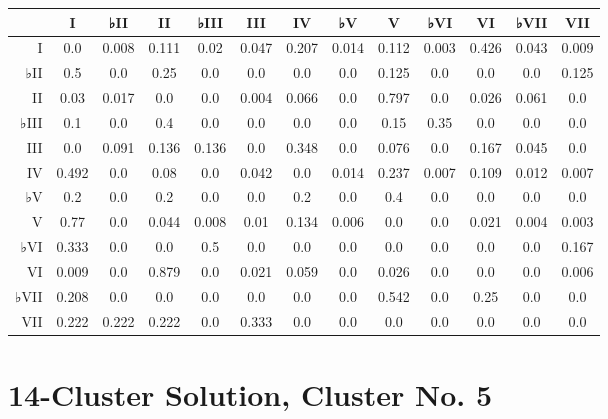 \begin{table}[htbp]
\begin{minipage}{\linewidth}
\setlength{\tymax}{0.5\linewidth}
\centering
\small
\begin{tabulary}{\textwidth}{@{}RCCCCCCCCCCCC@{}} \toprule
&I&♭II&II&♭III&III&IV&♭V&V&♭VI&VI&♭VII&VII\\
\midrule
I&0.0&0.008&0.111&0.02&0.047&0.207&0.014&0.112&0.003&0.426&0.043&0.009\\
♭II&0.5&0.0&0.25&0.0&0.0&0.0&0.0&0.125&0.0&0.0&0.0&0.125\\
II&0.03&0.017&0.0&0.0&0.004&0.066&0.0&0.797&0.0&0.026&0.061&0.0\\
♭III&0.1&0.0&0.4&0.0&0.0&0.0&0.0&0.15&0.35&0.0&0.0&0.0\\
III&0.0&0.091&0.136&0.136&0.0&0.348&0.0&0.076&0.0&0.167&0.045&0.0\\
IV&0.492&0.0&0.08&0.0&0.042&0.0&0.014&0.237&0.007&0.109&0.012&0.007\\
♭V&0.2&0.0&0.2&0.0&0.0&0.2&0.0&0.4&0.0&0.0&0.0&0.0\\
V&0.77&0.0&0.044&0.008&0.01&0.134&0.006&0.0&0.0&0.021&0.004&0.003\\
♭VI&0.333&0.0&0.0&0.5&0.0&0.0&0.0&0.0&0.0&0.0&0.0&0.167\\
VI&0.009&0.0&0.879&0.0&0.021&0.059&0.0&0.026&0.0&0.0&0.0&0.006\\
♭VII&0.208&0.0&0.0&0.0&0.0&0.0&0.0&0.542&0.0&0.25&0.0&0.0\\
VII&0.222&0.222&0.222&0.0&0.333&0.0&0.0&0.0&0.0&0.0&0.0&0.0\\

\bottomrule

\end{tabulary}
\end{minipage}
\end{table}

\section{14-Cluster Solution, Cluster No. 5}
\label{14-clustersolutionclusterno.5}

